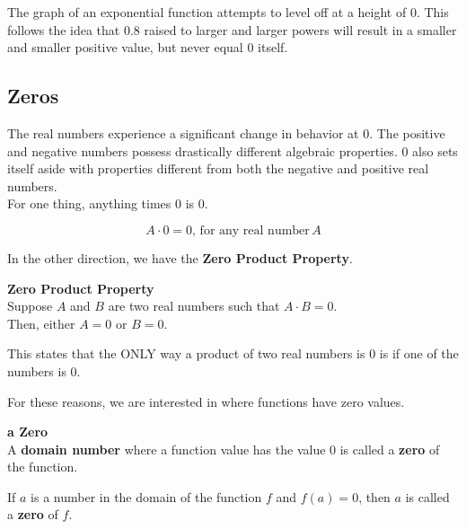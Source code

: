 \documentclass{ximera}
\begin{document}
The graph of an exponential function attempts to level off at a height of $0$.  This follows the idea that $0.8$ raised to larger and larger powers will result in a smaller and smaller positive value, but never equal $0$ itself.












\subsection*{Zeros}

The real numbers experience a significant change in behavior at $0$.  The positive and negative numbers possess drastically different algebraic properties.  $0$ also sets itself aside with properties different from both the negative and positive real numbers. \\


For one thing, anything times $0$ is $0$.


\[
A \cdot 0 = 0, \, \text{for any real number} \, A
\]

In the other direction, we have the \textbf{\textcolor{purple!85!blue}{Zero Product Property}}.  








\begin{definition}  \textbf{\textcolor{green!50!black}{Zero Product Property}} \\


Suppose $A$ and $B$ are two real numbers such that $A \cdot B = 0$. \\


Then, either $A = 0$ or $B = 0$.




\end{definition}









This states that the ONLY way a product of two real numbers is $0$ is if one of the numbers is $0$.

For these reasons, we are interested in where functions have zero values.






\begin{definition}  \textbf{\textcolor{green!50!black}{a Zero}} \\


A \textbf{domain number} where a function value has the value $0$ is called a \textbf{zero} of the function.


\begin{center}
If $a$ is a number in the domain of the function $f$ and $f(a) = 0$, then $a$ is called a \textbf{zero} of $f$.
\end{center}


\end{definition}
\end{document}
